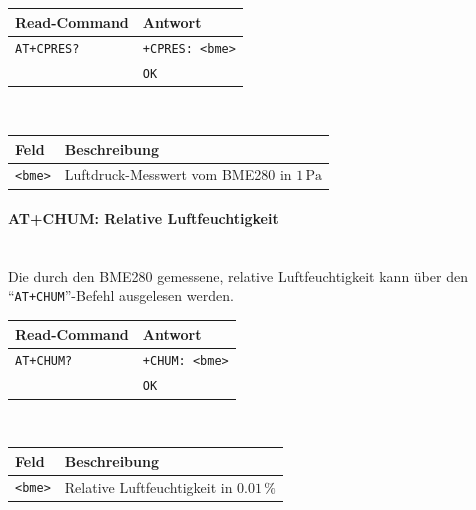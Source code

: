         \begin{table}[H]
            \centering
            \begin{tabular}{|p{}|p{}|}
                \hline
                \textbf{Read-Command} &\textbf{Antwort} \\
                \hline
                \texttt{AT+CPRES?}  & \texttt{+CPRES: <bme>}\\
                & \texttt{OK}\\
                \hline
            \end{tabular}\\[3mm]
            \begin{tabular}{|p{}|p{}|}
                \hline
                \textbf{Feld}       & \textbf{Beschreibung}\\
                \hline
                \texttt{<bme>}      & Luftdruck-Messwert vom BME280 in $1\,\mathrm{Pa}$\\
                \hline
            \end{tabular}
        \end{table}
    
        \paragraph{AT+CHUM: Relative Luftfeuchtigkeit}\mbox{}\\
        Die durch den BME280 gemessene, relative Luftfeuchtigkeit kann über den ``\texttt{AT+CHUM}''-Befehl ausgelesen werden.
        
        \begin{table}[H]
            \centering
            \begin{tabular}{|p{}|p{}|}
                \hline
                \textbf{Read-Command} &\textbf{Antwort} \\
                \hline
                \texttt{AT+CHUM?}  & \texttt{+CHUM: <bme>}\\
                & \texttt{OK}\\
                \hline
            \end{tabular}\\[3mm]
            \begin{tabular}{|p{}|p{}|}
                \hline
                \textbf{Feld}       & \textbf{Beschreibung}\\
                \hline
                \texttt{<bme>}      & Relative Luftfeuchtigkeit in $0.01\,\%$\\
                \hline
            \end{tabular}
        \end{table}
    

